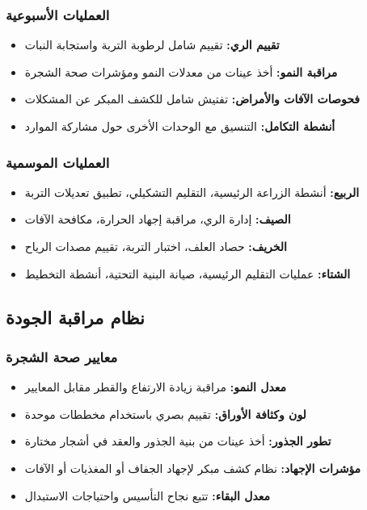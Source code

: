 \subsubsection{العمليات الأسبوعية}
\begin{itemize}
    \item \textbf{تقييم الري:} تقييم شامل لرطوبة التربة واستجابة النبات
    \item \textbf{مراقبة النمو:} أخذ عينات من معدلات النمو ومؤشرات صحة الشجرة
    \item \textbf{فحوصات الآفات والأمراض:} تفتيش شامل للكشف المبكر عن المشكلات
    \item \textbf{أنشطة التكامل:} التنسيق مع الوحدات الأخرى حول مشاركة الموارد
\end{itemize}

\subsubsection{العمليات الموسمية}
\begin{itemize}
    \item \textbf{الربيع:} أنشطة الزراعة الرئيسية، التقليم التشكيلي، تطبيق تعديلات التربة
    \item \textbf{الصيف:} إدارة الري، مراقبة إجهاد الحرارة، مكافحة الآفات
    \item \textbf{الخريف:} حصاد العلف، اختبار التربة، تقييم مصدات الرياح
    \item \textbf{الشتاء:} عمليات التقليم الرئيسية، صيانة البنية التحتية، أنشطة التخطيط
\end{itemize}

\subsection{نظام مراقبة الجودة}

\subsubsection{معايير صحة الشجرة}
\begin{itemize}
    \item \textbf{معدل النمو:} مراقبة زيادة الارتفاع والقطر مقابل المعايير
    \item \textbf{لون وكثافة الأوراق:} تقييم بصري باستخدام مخططات موحدة
    \item \textbf{تطور الجذور:} أخذ عينات من بنية الجذور والعقد في أشجار مختارة
    \item \textbf{مؤشرات الإجهاد:} نظام كشف مبكر لإجهاد الجفاف أو المغذيات أو الآفات
    \item \textbf{معدل البقاء:} تتبع نجاح التأسيس واحتياجات الاستبدال
\end{itemize}

